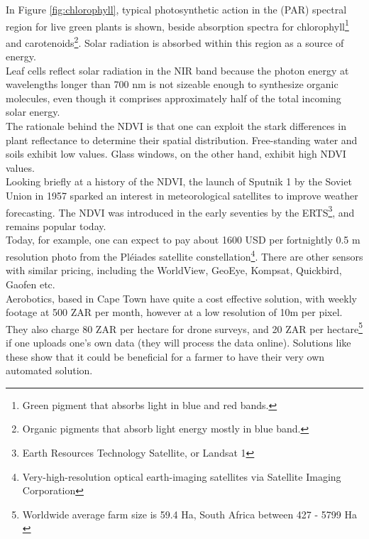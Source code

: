 In Figure \ref{fig:chlorophyll}, typical photosynthetic action in the (PAR) spectral region for live green plants is shown, beside absorption spectra for chlorophyll\footnote{Green pigment that absorbs light in blue and red bands.} and carotenoids\footnote{Organic pigments that absorb light energy mostly in blue band.}. Solar radiation is absorbed within this region as a source of energy. \\

Leaf cells reflect solar radiation in the NIR band because the photon energy at wavelengths longer than 700 nm is not sizeable enough to synthesize organic molecules, even though it comprises approximately half of the total incoming solar energy.\\

The rationale behind the NDVI is that one can exploit the stark differences in plant reflectance to determine their spatial distribution. Free-standing water and soils exhibit low values. Glass windows, on the other hand, exhibit high NDVI values.\\

Looking briefly at a history of the NDVI, the launch of Sputnik 1 by the Soviet Union in 1957 sparked an interest in meteorological satellites to improve weather forecasting. The NDVI was introduced in the early seventies by the ERTS\footnote{Earth Resources Technology Satellite, or Landsat 1}, and remains popular today. \\

Today, for example, one can expect to pay about 1600 USD per fortnightly 0.5 m resolution photo from the Pléiades satellite constellation\footnote{Very-high-resolution optical earth-imaging satellites via Satellite Imaging Corporation}. There are other sensors with similar pricing, including the WorldView, GeoEye, Kompsat, Quickbird, Gaofen etc.\\Aerobotics, based in Cape Town have quite a cost effective solution, with weekly footage at 500 ZAR per month, however at a low resolution of 10m per pixel. They also charge 80 ZAR per hectare for drone surveys, and 20 ZAR per hectare\footnote{Worldwide average farm size is 59.4 Ha\cite{farm_size}, South Africa between 427 - 5799 Ha \cite{farm_size_sa}} if one uploads one's own data (they will process the data online). Solutions like these show that it could be beneficial for a farmer to have their very own automated solution.\\

